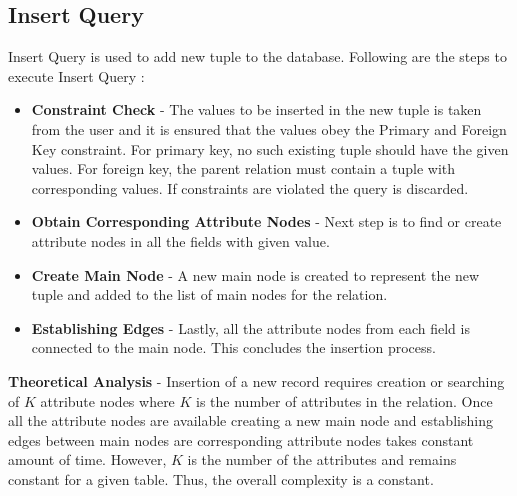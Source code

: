 \documentclass[12pt, oneside]{book}
\begin{document}
\subsection{Insert Query}
Insert Query is used to add new tuple to the database. Following are the steps to execute Insert Query :
\begin{itemize}
 \item \textbf{Constraint Check} - The values to be inserted in the new tuple is taken from the user and it is ensured that the values obey the Primary and Foreign Key constraint. For primary key, no such existing tuple should have the given values. For foreign key, the parent relation must contain a tuple with corresponding values. If constraints are violated the query is discarded.
 \item \textbf{Obtain Corresponding Attribute Nodes} - Next step is to find or create attribute nodes in all the fields with given value.
 \item \textbf{Create Main Node} - A new main node is created to represent the new tuple and added to the list of main nodes for the relation.
 \item \textbf{Establishing Edges} - Lastly, all the attribute nodes from each field is connected to the main node. This concludes the insertion process.
\end{itemize}
 \par \textbf{Theoretical Analysis} - Insertion of a new record requires creation or searching of $K$ attribute nodes where $K$ is the number of attributes in the relation. Once all the attribute nodes are available creating a new main node and establishing edges between main nodes are corresponding attribute nodes takes constant amount of time. However, $K$ is the number of the attributes and remains constant for a given table. Thus, the overall complexity is a constant.
\end{document}
